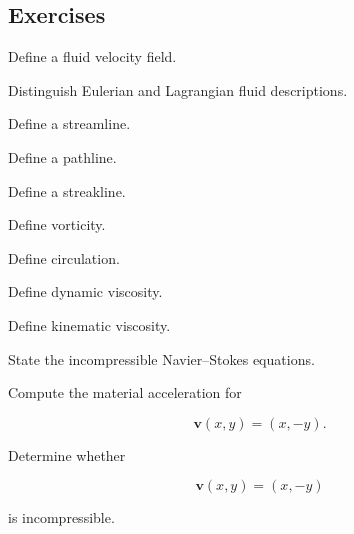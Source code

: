 \subsection{Exercises}
\label{subsec:fluid-dynamics-exercises}

\begin{exercise}[1]
Define a fluid velocity field.
\end{exercise}

\begin{exercise}[1]
Distinguish Eulerian and Lagrangian fluid descriptions.
\end{exercise}

\begin{exercise}[1]
Define a streamline.
\end{exercise}

\begin{exercise}[1]
Define a pathline.
\end{exercise}

\begin{exercise}[1]
Define a streakline.
\end{exercise}

\begin{exercise}[1]
Define vorticity.
\end{exercise}

\begin{exercise}[1]
Define circulation.
\end{exercise}

\begin{exercise}[1]
Define dynamic viscosity.
\end{exercise}

\begin{exercise}[1]
Define kinematic viscosity.
\end{exercise}

\begin{exercise}[1]
State the incompressible Navier--Stokes equations.
\end{exercise}

\begin{exercise}[2]
Compute the material acceleration for

\[
\mathbf{v}(x,y)
=
(x,-y).
\]
\end{exercise}

\begin{exercise}[2]
Determine whether

\[
\mathbf{v}(x,y)
=
(x,-y)
\]

is incompressible.
\end{exercise}

